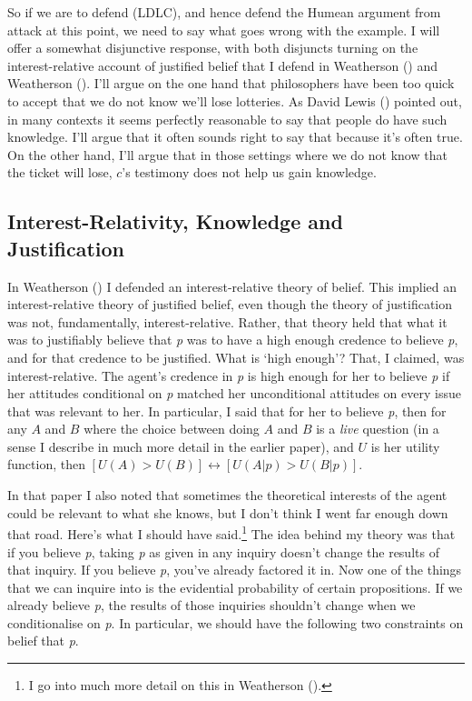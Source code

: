 \documentclass[
  10pt,
  letterpaper,
  DIV=11,
  numbers=noendperiod,
  twoside]{scrartcl}
\begin{document}
So if we are to defend (LDLC), and hence defend the Humean argument from
attack at this point, we need to say what goes wrong with the example. I
will offer a somewhat disjunctive response, with both disjuncts turning
on the interest-relative account of justified belief that I defend in
Weatherson () and Weatherson
(). I'll argue on the one hand
that philosophers have been too quick to accept that we do not know
we'll lose lotteries. As David Lewis ()
pointed out, in many contexts it seems perfectly reasonable to say that
people do have such knowledge. I'll argue that it often sounds right to
say that because it's often true. On the other hand, I'll argue that in
those settings where we do not know that the ticket will lose, \(c\)'s
testimony does not help us gain knowledge.

\subsection{Interest-Relativity, Knowledge and
Justification}\label{interest-relativity-knowledge-and-justification}

In Weatherson () I defended
an interest-relative theory of belief. This implied an interest-relative
theory of justified belief, even though the theory of justification was
not, fundamentally, interest-relative. Rather, that theory held that
what it was to justifiably believe that \emph{p} was to have a high
enough credence to believe \emph{p}, and for that credence to be
justified. What is `high enough'? That, I claimed, was
interest-relative. The agent's credence in \emph{p} is high enough for
her to believe \emph{p} if her attitudes conditional on \emph{p} matched
her unconditional attitudes on every issue that was relevant to her. In
particular, I said that for her to believe \emph{p}, then for any \(A\)
and \(B\) where the choice between doing \(A\) and \(B\) is a
\emph{live} question (in a sense I describe in much more detail in the
earlier paper), and \(U\) is her utility function, then
\([U(A) > U(B)] \leftrightarrow [U(A | p) > U(B | p)]\).

In that paper I also noted that sometimes the theoretical interests of
the agent could be relevant to what she knows, but I don't think I went
far enough down that road. Here's what I should have said.\footnote{I go
  into much more detail on this in Weatherson
  ().} The idea behind my
theory was that if you believe \emph{p}, taking \emph{p} as given in any
inquiry doesn't change the results of that inquiry. If you believe
\emph{p}, you've already factored it in. Now one of the things that we
can inquire into is the evidential probability of certain propositions.
If we already believe \emph{p}, the results of those inquiries shouldn't
change when we conditionalise on \emph{p}. In particular, we should have
the following two constraints on belief that \emph{p}.
\end{document}
